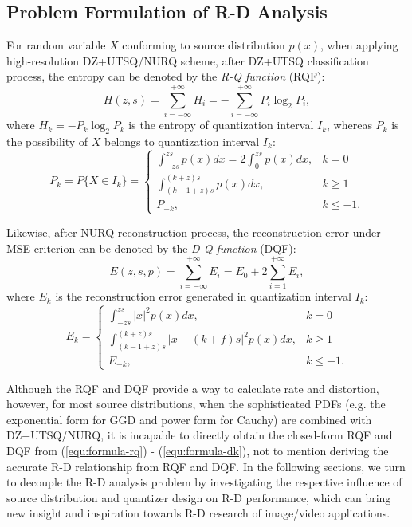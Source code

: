 \documentclass[smallabstract,smallcaptions]{dccpaper}
\begin{document}
\subsection{Problem Formulation of R-D Analysis}
For random variable $X$ conforming to source distribution $p(x)$, when applying high-resolution DZ+UTSQ/NURQ scheme, after DZ+UTSQ classification process, the entropy can be denoted by the \emph{R-Q function} (RQF):
\begin{equation}\label{equ:formula-rq}
	H(z, s) = \sum_{i=-\infty}^{+\infty} H_i
	= -\sum_{i=-\infty}^{+\infty} P_i \log_2 P_i ,
\end{equation}
where $H_k = - P_k \log_2 P_k$ is the entropy of quantization interval $I_k$, whereas $P_k$ is the possibility of $X$ belongs to quantization interval $I_{k}$:
\begin{equation}\label{equ:formula-pk}
	P_k = P\{X \in I_k\} =
	\begin{cases}
		\int_{-z s}^{z s} p(x) dx
		= 2 \int_{0}^{z s} p(x) dx,
		& k=0 \\
		\int_{(k-1+z) s}^{(k+z) s} p(x) dx,
		& k \ge 1 \\
		P_{-k},
		& k \le -1 .
	\end{cases}
\end{equation}  

Likewise, after NURQ reconstruction process, the reconstruction error under MSE criterion can be denoted by the \emph{D-Q function} (DQF):
\begin{equation}\label{equ:formula-dq}
	E(z, s, p) =\sum_{i=-\infty}^{+\infty} E_i
	=E_0 + 2 \sum_{i=1}^{+\infty} E_i ,
\end{equation}
where $E_k$ is the reconstruction error generated in quantization interval $I_k$:
\begin{equation}\label{equ:formula-dk}
	E_k=
	\begin{cases}
		\int_{-z s}^{z s} |x|^2 p(x) dx,
		& k=0 \\
		\int_{(k-1+z) s}^{(k+z) s} |x - (k+f) s|^2 p(x) dx,
		& k \ge 1 \\
		E_{-k},
		& k \le -1 .
	\end{cases}
\end{equation}

Although the RQF and DQF provide a way to calculate rate and distortion, however, for most source distributions, when the sophisticated PDFs (e.g. the exponential form for GGD and power form for Cauchy) are combined with DZ+UTSQ/NURQ, it is incapable to directly obtain the closed-form RQF and DQF from (\ref{equ:formula-rq}) - (\ref{equ:formula-dk}), not to mention deriving the accurate R-D relationship from RQF and DQF. In the following sections, we turn to decouple the R-D analysis problem by investigating the respective influence of source distribution and quantizer design on R-D performance, which can bring new insight and inspiration towards R-D research of image/video applications. 
\end{document}
